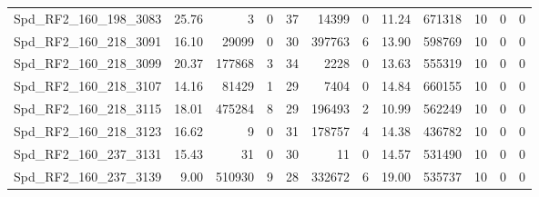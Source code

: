 \begin{longtable}[c]{@{}lrrrrrrrrrrr@{}}
Spd\_RF2\_160\_198\_3083      & 25.76                  & 3                       & 0                       & 37                     & 14399                   & 0                       & 11.24                   & 671318                   & 10                       & 0                        & 0                        \\
Spd\_RF2\_160\_218\_3091      & 16.10                  & 29099                   & 0                       & 30                     & 397763                  & 6                       & 13.90                   & 598769                   & 10                       & 0                        & 0                        \\
Spd\_RF2\_160\_218\_3099      & 20.37                  & 177868                  & 3                       & 34                     & 2228                    & 0                       & 13.63                   & 555319                   & 10                       & 0                        & 0                        \\
Spd\_RF2\_160\_218\_3107      & 14.16                  & 81429                   & 1                       & 29                     & 7404                    & 0                       & 14.84                   & 660155                   & 10                       & 0                        & 0                        \\
Spd\_RF2\_160\_218\_3115      & 18.01                  & 475284                  & 8                       & 29                     & 196493                  & 2                       & 10.99                   & 562249                   & 10                       & 0                        & 0                        \\
Spd\_RF2\_160\_218\_3123      & 16.62                  & 9                       & 0                       & 31                     & 178757                  & 4                       & 14.38                   & 436782                   & 10                       & 0                        & 0                        \\
Spd\_RF2\_160\_237\_3131      & 15.43                  & 31                      & 0                       & 30                     & 11                      & 0                       & 14.57                   & 531490                   & 10                       & 0                        & 0                        \\
Spd\_RF2\_160\_237\_3139      & 9.00                   & 510930                  & 9                       & 28                     & 332672                  & 6                       & 19.00                   & 535737                   & 10                       & 0                        & 0                        \\

\end{longtable}
